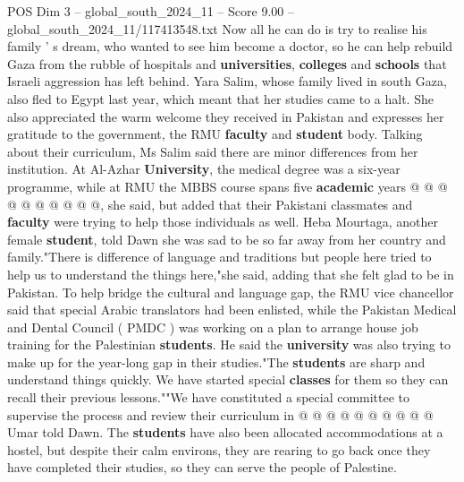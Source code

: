 \begin{textsample}{POS Dim 3 – global\_south\_2024\_11 – Score 9.00 – global\_south\_2024\_11/117413548.txt}
Now all he can do is try to realise his family ' s dream, who wanted to see him become a doctor, so he can help rebuild Gaza from the rubble of hospitals and \textbf{universities}, \textbf{colleges} and \textbf{schools} that Israeli aggression has left behind.
Yara Salim, whose family lived in south Gaza, also fled to Egypt last year, which meant that her studies came to a halt.
She also appreciated the warm welcome they received in Pakistan and expresses her gratitude to the government, the RMU \textbf{faculty} and \textbf{student} body.
Talking about their curriculum, Ms Salim said there are minor differences from her institution.
At Al-Azhar \textbf{University}, the medical degree was a six-year programme, while at RMU the MBBS course spans five \textbf{academic} years @ @ @ @ @ @ @ @ @ @, she said, but added that their Pakistani classmates and \textbf{faculty} were trying to help those individuals as well.
Heba Mourtaga, another female \textbf{student}, told Dawn she was sad to be so far away from her country and family."There is difference of language and traditions but people here tried to help us to understand the things here,"she said, adding that she felt glad to be in Pakistan.
To help bridge the cultural and language gap, the RMU vice chancellor said that special Arabic translators had been enlisted, while the Pakistan Medical and Dental Council ( PMDC ) was working on a plan to arrange house job training for the Palestinian \textbf{students}.
He said the \textbf{university} was also trying to make up for the year-long gap in their studies."The \textbf{students} are sharp and understand things quickly.
We have started special \textbf{classes} for them so they can recall their previous lessons.""We have constituted a special committee to supervise the process and review their curriculum in @ @ @ @ @ @ @ @ @ @ Umar told Dawn.
The \textbf{students} have also been allocated accommodations at a hostel, but despite their calm environs, they are rearing to go back once they have completed their studies, so they can serve the people of Palestine.

\end{textsample}

